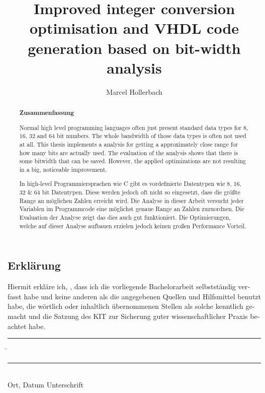 \documentclass[parskip=full,12pt,a4paper,twoside,headings=openright]{scrreprt}
\title{Improved integer conversion optimisation and VHDL code generation based on bit-width analysis}
\author{Marcel Hollerbach}
\begin{document}
\begin{otherlanguage}{ngerman} %
\mytitlepage
\end{otherlanguage}

\begin{abstract}
\begin{center}\Huge\textbf{\textsf{Zusammenfassung}}
\end{center}
\vfill

Normal high level programming languages often just present standard data types for 8, 16, 32 and 64 bit numbers. The whole bandwidth of those data types is often not used at all. This thesis implements a analysis for getting a approximately close range for how many bits are actually used. The evaluation of the analysis shows that there is some bitwidth that can be saved. However, the applied optimizations are not resulting in a big, noticeable improvement.

\vfill

In high-level Programmiersprachen wie C gibt es vordefinierte Datentypen wie 8, 16, 32 \& 64 bit Datentypen. Diese werden jedoch oft nicht so eingesetzt, dass die größte Range an möglichen Zahlen erreicht wird. Die Analyse in dieser Arbeit versucht jeder Variablen im Programmcode eine möglichst genaue Range an Zahlen zuzuordnen. Die Evaluation der Analyse zeigt das dies auch gut funktioniert. Die Optimierungen, welche auf dieser Analyse aufbauen erzielen jedoch keinen großen Performance Vorteil.

\end{abstract}

\tableofcontents










\begin{otherlanguage}{ngerman}
\chapter*{Erklärung}
\pagestyle{empty}

  \vspace{20mm}
  Hiermit erkläre ich, \theauthor, dass ich die vorliegende Bachelorarbeit selbst\-ständig
verfasst habe und keine anderen als die angegebenen Quellen und Hilfsmittel
benutzt habe, die wörtlich oder inhaltlich übernommenen Stellen als solche kenntlich gemacht und
die Satzung des KIT zur Sicherung guter wissenschaftlicher Praxis beachtet habe.
  \vspace{20mm}
  \begin{tabbing}
  \rule{4cm}{.4pt}\hspace{1cm} \= \rule{7cm}{.4pt} \\
 Ort, Datum \> Unterschrift
  \end{tabbing}
\end{otherlanguage}

\pagestyle{fancy}
\appendix


\end{document}
